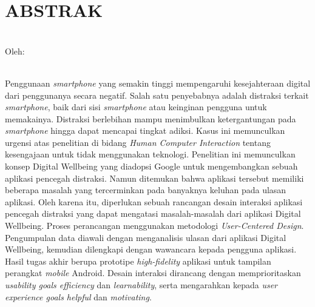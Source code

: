 \clearpage
\chapter*{ABSTRAK}

\begin{center}
  \textbf{\MakeUppercase{\thetitle}} \\[1em]
  
  Oleh: \\
  \MakeUppercase{\theauthor} \\
\end{center}

\begin{singlespace}
  Penggunaan \textit{smartphone} yang semakin tinggi mempengaruhi kesejahteraan digital dari penggunanya secara negatif.
  Salah satu penyebabnya adalah distraksi terkait \textit{smartphone}, baik dari sisi \textit{smartphone} atau keinginan pengguna untuk memakainya.
  Distraksi berlebihan mampu menimbulkan ketergantungan pada \textit{smartphone} hingga dapat mencapai tingkat adiksi.
  Kasus ini memunculkan urgensi atas penelitian di bidang \textit{Human Computer Interaction} tentang kesengajaan untuk tidak menggunakan teknologi.
  Penelitian ini memunculkan konsep Digital Wellbeing yang diadopsi Google untuk mengembangkan sebuah aplikasi pencegah distraksi.
  Namun ditemukan bahwa aplikasi tersebut memiliki beberapa masalah yang tercerminkan pada banyaknya keluhan pada ulasan aplikasi.
  Oleh karena itu, diperlukan sebuah rancangan desain interaksi aplikasi pencegah distraksi yang dapat mengatasi masalah-masalah dari aplikasi Digital Wellbeing.
  Proses perancangan menggunakan metodologi \textit{User-Centered Design}.
  Pengumpulan data diawali dengan menganalisis ulasan dari aplikasi Digital Wellbeing, kemudian dilengkapi dengan wawancara kepada pengguna aplikasi.
  Hasil tugas akhir berupa prototipe \textit{high-fidelity} aplikasi untuk tampilan perangkat \textit{mobile} Android.
  Desain interaksi dirancang dengan memprioritaskan \textit{usability goals efficiency} dan \textit{learnability}, serta mengarahkan kepada \textit{user experience goals helpful} dan \textit{motivating}.

\end{singlespace}
